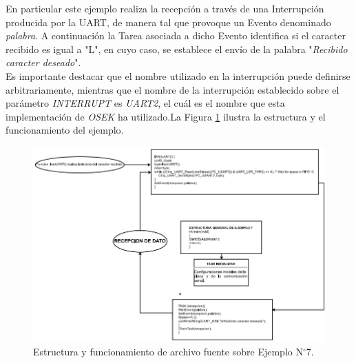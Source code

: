 \documentclass[12pt,letterpaper]{article}
\begin{document}
En particular este ejemplo realiza la recepción a través de una Interrupción producida por la UART, de manera tal que provoque un Evento denominado \textit{palabra}. A continuación la Tarea asociada a dicho Evento identifica si el caracter recibido es igual a "L", en cuyo caso, se establece el envío de la palabra "\textit{Recibido caracter deseado}".
 \\
 
Es importante destacar que el nombre utilizado en la interrupción puede definirse arbitrariamente, mientras que el nombre de la interrupción establecido sobre el parámetro \textit{INTERRUPT} es \textit{UART2}, el cuál es el nombre que esta implementación de \textit{OSEK} ha utilizado.La Figura \ref{Fig45} ilustra la estructura y el funcionamiento del ejemplo.

\begin{figure}[H]
\centering
\includegraphics[width=17 cm]{figuras/f38.png}
\caption{Estructura y funcionamiento de archivo fuente sobre Ejemplo N$^{\circ}$7.}
\label{Fig45}
\end{figure}
\end{document}
